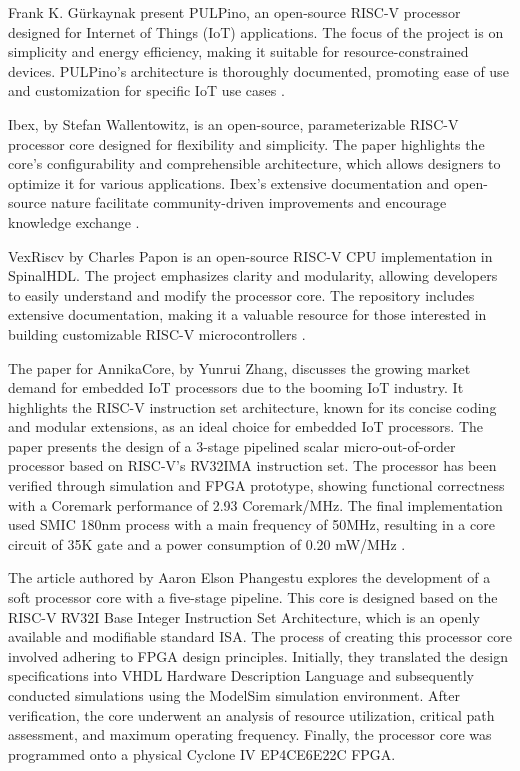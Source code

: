 Frank K. Gürkaynak present PULPino, an open-source RISC-V processor designed for Internet of Things (IoT) applications. The focus of the project is on 
simplicity and energy efficiency, making it suitable for resource-constrained devices. PULPino's architecture is thoroughly documented, 
promoting ease of use and customization for specific IoT use cases \cite{pulpino}.


Ibex, by Stefan Wallentowitz, is an open-source, parameterizable RISC-V processor core designed for flexibility and simplicity. 
The paper highlights the core's configurability and comprehensible architecture, which allows designers to optimize it for various applications. 
Ibex's extensive documentation and open-source nature facilitate 
community-driven improvements and encourage knowledge exchange \cite{ibex}.


VexRiscv by Charles Papon is an open-source RISC-V CPU implementation in SpinalHDL. The project emphasizes clarity and modularity, 
allowing developers to easily understand and modify the processor core. The repository includes extensive documentation, 
making it a valuable resource for those interested in building customizable RISC-V microcontrollers \cite{vexriscv}.


The paper for AnnikaCore, by Yunrui Zhang, discusses the growing market demand for embedded IoT processors due to the booming IoT industry. 
It highlights the RISC-V instruction set architecture, known for its concise coding and modular extensions, 
as an ideal choice for embedded IoT processors. The paper presents the design of a 3-stage pipelined scalar micro-out-of-order 
processor based on RISC-V's RV32IMA instruction set. The processor has been verified through simulation and FPGA prototype, 
showing functional correctness with a Coremark performance of 2.93 Coremark/MHz. 
The final implementation used SMIC 180nm process with a main frequency of 50MHz, resulting in a core circuit of 35K gate 
and a power consumption of 0.20 mW/MHz \cite{annikacore}.

The article authored by Aaron Elson Phangestu explores the development of a soft processor core with a five-stage pipeline. 
This core is designed based on the RISC-V RV32I Base Integer Instruction Set Architecture, which is an openly available and 
modifiable standard ISA. The process of creating this processor core involved adhering to FPGA design principles. 
Initially, they translated the design specifications into VHDL Hardware Description Language and subsequently conducted 
simulations using the ModelSim simulation environment. After verification, the core underwent an analysis of 
resource utilization, critical path assessment, and maximum operating frequency. 
Finally, the processor core was programmed onto a physical Cyclone IV EP4CE6E22C FPGA. \cite{32bitcore}

